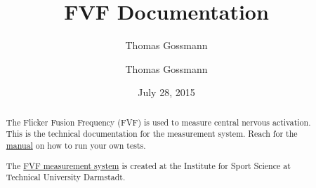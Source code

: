 \documentclass[11pt,accentcolor=tud2a,colorback,noheadingspace,bigchapter]{tudreport}
\date{July 28, 2015}
\author{Thomas Gossmann}
\title{FVF Documentation}
\subtitle{Thomas Gossmann}
\begin{document}
\maketitle

\begin{abstract}
The Flicker Fusion Frequency (FVF) is used to measure central nervous activation. 
This is the technical documentation for the measurement system. Reach for the 
\href{https://fvf-manual.readthedocs.org}{manual} on how to run your own tests.

The \href{http://www.sport.tu-darmstadt.de/sportinstitut/personal/professoren/wiemeyer\_seiten/forschung\_detail/forschung\_flimmerverschmelzungsfrequenz.de.jsp}{FVF measurement system} 
is created at the Institute for Sport Science at Technical University Darmstadt.
\end{abstract}

\setcounter{tocdepth}{1}
\tableofcontents






\end{document}
